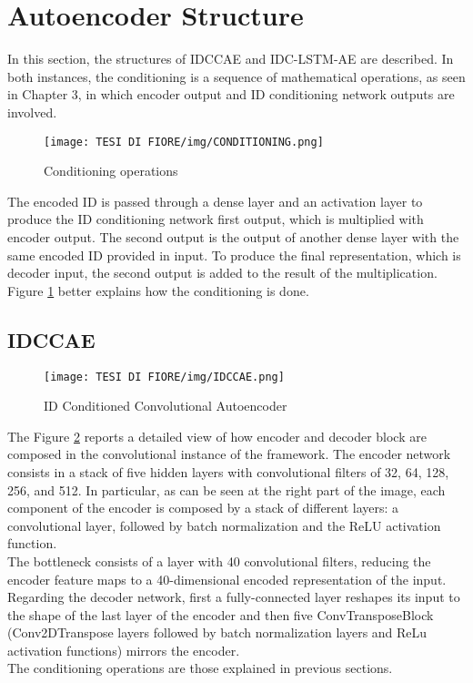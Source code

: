 \section{Autoencoder Structure}
In this section, the structures of IDCCAE and IDC-LSTM-AE are described. In both instances, the conditioning is a sequence of mathematical operations, as seen in Chapter 3, in which encoder output and ID conditioning network outputs are involved.

\begin{figure}[ht]
\texttt{[image: TESI DI FIORE/img/CONDITIONING.png]}
\centering
\caption{Conditioning operations}
\label{conditioning}
\end{figure}

The encoded ID is passed through a dense layer and an activation layer to produce the ID conditioning network first output, which is multiplied with encoder output. The second output is the output of another dense layer with the same encoded ID provided in input. To produce the final representation, which is decoder input, the second output is added to the result of the multiplication. Figure \ref{conditioning} better explains how the conditioning is done.

\subsection{IDCCAE}

\begin{figure}[ht]
\texttt{[image: TESI DI FIORE/img/IDCCAE.png]}
\centering
\caption{ID Conditioned Convolutional Autoencoder}
\label{IDCCAE}
\end{figure}

The Figure \ref{IDCCAE} reports a detailed view of how encoder and decoder block are composed in the convolutional instance of the framework. The encoder network consists in a stack of five hidden layers with convolutional filters of 32, 64, 128, 256, and 512. In particular, as can be seen at the right part of the image, each component of the encoder is composed by a stack of different layers: a convolutional layer, followed by batch normalization and the ReLU activation function.\\
The bottleneck consists of a layer with 40 convolutional filters, reducing the encoder feature maps to a 40-dimensional encoded representation of the input. Regarding the decoder network, first a fully-connected layer reshapes its input to the shape of the last layer of the encoder and then five ConvTransposeBlock (Conv2DTranspose layers followed by batch normalization layers and ReLu activation functions) mirrors the encoder.\\
The conditioning operations are those explained in previous sections.

